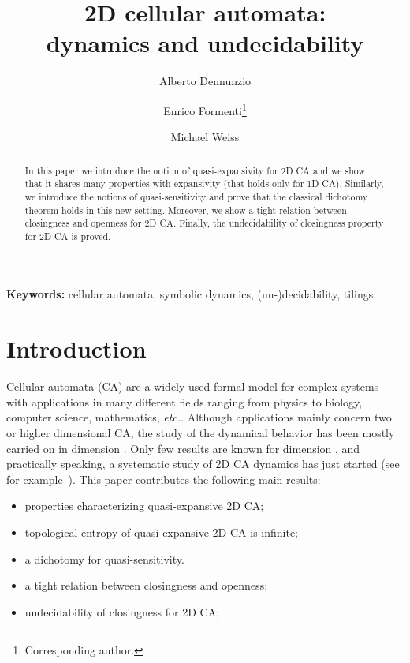 \documentclass{llncs}
\makeatletter
\newcommand{\etc}{\emph{etc.}\@\xspace}
\newcommand{\ignore}[1]{}
\makeatother
\begin{document}
\pagestyle{empty}  \mainmatter
\title{2D cellular automata:\\ dynamics and undecidability
\ignore{
\thanks{This work has been supported by
the PRIN/MIUR project
``Formal Languages and Automata: Mathematical and Applicative Aspects''.} }}\author{Alberto Dennunzio
\and Enrico Formenti\thanks{Corresponding author.}
\and Michael Weiss}
\maketitle

\begin{abstract}
In this paper we introduce the notion of quasi-expansivity for 2D
CA and we show that it shares many properties with expansivity (that holds only for 1D
CA). Similarly, we introduce the notions of quasi-sensitivity and prove that the classical dichotomy theorem holds in
this new setting. Moreover, we show a tight relation between 
closingness and openness for 2D CA. Finally, the undecidability of
closingness property for 2D CA is proved. 
\end{abstract}
\noindent
\textbf{Keywords:} cellular automata, symbolic dynamics, (un-)decidability, tilings.



\section{Introduction}
Cellular automata (CA) are a widely used formal model for complex systems with applications in many different fields ranging from
physics to biology, computer science, mathematics, \etc.
Although applications mainly concern two or higher dimensional
CA, the study of the dynamical behavior has been mostly carried on 
in dimension . Only few results are known for dimension , and practically speaking,  a systematic study of 2D CA dynamics has just started (see for example~\cite{theyssier08,dennunzio08}).
This paper contributes the following main results:
\begin{itemize}
\item properties characterizing quasi-expansive 2D CA;
\item topological entropy of quasi-expansive 2D CA is infinite;
\item a dichotomy for quasi-sensitivity.
\item a tight relation between closingness and openness;
\item undecidability of closingness for 2D CA;
\end{itemize}
\end{document}
